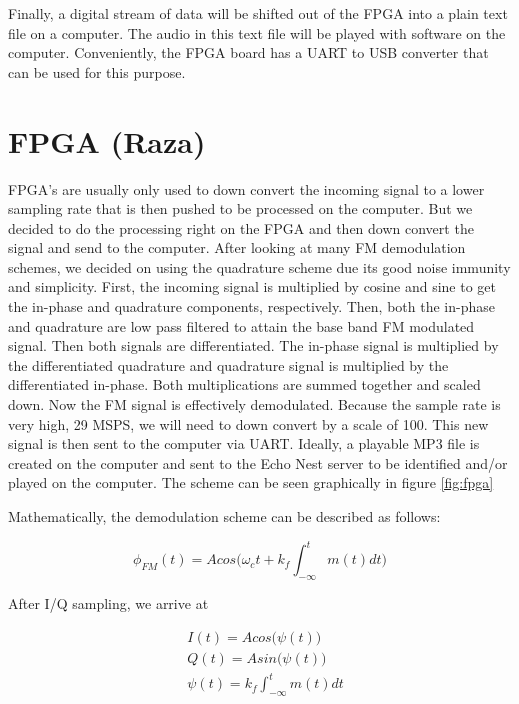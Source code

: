 \documentclass[a4paper, 12pt]{article}
\begin{document}
Finally, a digital stream of data will be shifted out of the FPGA into a plain text file on a computer.  The audio in this text file will be played with software on the computer.  Conveniently, the FPGA board has a UART to USB converter that can be used for this purpose.

\section{FPGA (Raza)}
FPGA’s are usually only used to down convert the incoming signal to a lower sampling rate that is then pushed to be processed on the computer. But we decided to do the processing right on the FPGA and then down convert the signal and send to the computer. After looking at many FM demodulation schemes, we decided on using the quadrature scheme due its good noise immunity and simplicity. First, the incoming signal is multiplied by cosine and sine to get the in-phase and quadrature components, respectively. Then, both the in-phase and quadrature are low pass filtered to attain the base band FM modulated signal. Then both signals are differentiated. The in-phase signal is multiplied by the differentiated quadrature and quadrature signal is multiplied by the differentiated in-phase. Both multiplications are summed together and scaled down. Now the FM signal is effectively demodulated. Because the sample rate is very high, 29 MSPS, we will need to down convert by a scale of 100. This new signal is then sent to the computer via UART. Ideally, a playable MP3 file is created on the computer and sent to the Echo Nest server to be identified and/or played on the computer.  The scheme can be seen graphically in figure \ref{fig:fpga}

Mathematically, the demodulation scheme can be described as follows:

\begin{equation}
  \phi_{FM}(t) = Acos\big(\omega_ct + k_f\int_{-\infty}^{t}m(t)dt\big)
\end{equation}

After I/Q sampling, we arrive at

\begin{equation}
\begin{aligned}
  &I(t) = Acos\big(\psi(t)) \\
  &Q(t) = Asin\big(\psi(t)) \\
  &\psi(t) = k_f\int_{-\infty}^{t}m(t)dt \\
\end{aligned}
\end{equation}
\end{document}
